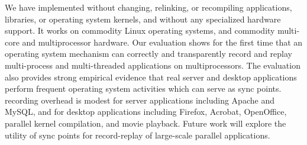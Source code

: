 We have implemented \scribe{} without changing, relinking, or
recompiling applications, libraries, or operating system kernels, and
without any specialized hardware support. It works on commodity Linux
operating systems, and commodity multi-core and multiprocessor
hardware.  Our evaluation shows for the first time that an operating
system mechanism can correctly and transparently record and replay
multi-process and multi-threaded applications on multiprocessors.  The
evaluation also provides strong empirical evidence that 
real server and desktop applications perform frequent
operating system activities which can serve as sync points.  \scribe{}
recording overhead is modest for server applications including Apache
and MySQL, and for desktop applications including Firefox, Acrobat,
OpenOffice, parallel kernel compilation, and movie playback. Future
work will explore the utility of sync points for record-replay of
large-scale parallel applications.
